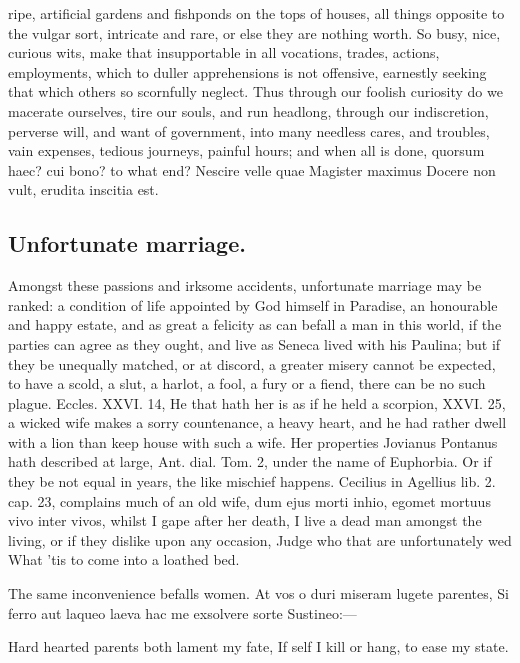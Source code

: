 {ripe, artificial gardens and fishponds on the tops of houses, all
things opposite to the vulgar sort, intricate and rare, or else they
are nothing worth. So busy, nice, curious wits, make that insupportable
in all vocations, trades, actions, employments, which to duller
apprehensions is not offensive, earnestly seeking that which others so
scornfully neglect. Thus through our foolish curiosity do we macerate
ourselves, tire our souls, and run headlong, through our indiscretion,
perverse will, and want of government, into many needless cares, and
troubles, vain expenses, tedious journeys, painful hours; and when all
is done, quorsum haec? cui bono? to what end?
Nescire velle quae Magister maximus
Docere non vult, erudita inscitia est.

\subsection{Unfortunate marriage.}
Amongst these passions and irksome accidents,
unfortunate marriage may be ranked: a condition of life appointed by
God himself in Paradise, an honourable and happy estate, and as great a
felicity as can befall a man in this world, if the parties can
agree as they ought, and live as Seneca lived with his Paulina;
but if they be unequally matched, or at discord, a greater misery
cannot be expected, to have a scold, a slut, a harlot, a fool, a fury
or a fiend, there can be no such plague. Eccles. XXVI. 14, He that hath
her is as if he held a scorpion, \etc{} XXVI. 25, a wicked wife makes a
sorry countenance, a heavy heart, and he had rather dwell with a lion
than keep house with such a wife. Her properties Jovianus
Pontanus hath described at large, Ant. dial. Tom. 2, under the name of
Euphorbia. Or if they be not equal in years, the like mischief happens.
Cecilius in Agellius lib. 2. cap. 23, complains much of an old wife,
dum ejus morti inhio, egomet mortuus vivo inter vivos, whilst I gape
after her death, I live a dead man amongst the living, or if they
dislike upon any occasion,
Judge who that are unfortunately wed
What 'tis to come into a loathed bed.

The same inconvenience befalls women.
At vos o duri miseram lugete parentes,
Si ferro aut laqueo laeva hac me exsolvere sorte
Sustineo:---

Hard hearted parents both lament my fate,
If self I kill or hang, to ease my state.

}
